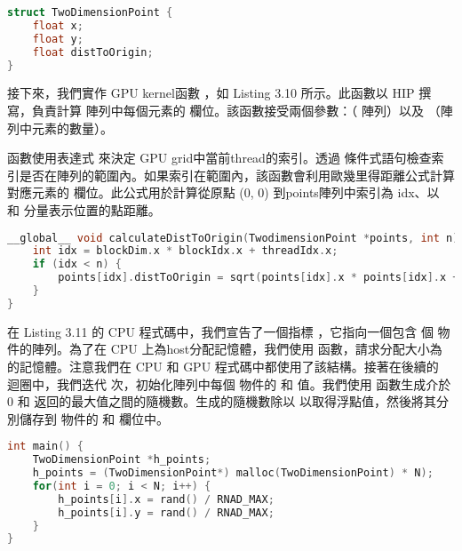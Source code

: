 \begin{lstlisting}[language=C, caption={在HIP中使用struct}, label={9th:example}]
struct TwoDimensionPoint {
    float x;
    float y;
    float distToOrigin;
}
\end{lstlisting}

接下來，我們實作 GPU kernel函數 ，如 Listing 3.10 所示。此函數以 HIP 撰寫，負責計算  陣列中每個元素的  欄位。該函數接受兩個參數：（ 陣列）以及 （陣列中元素的數量）。

函數使用表達式  來決定 GPU grid中當前thread的索引。透過  條件式語句檢查索引是否在陣列的範圍內。如果索引在範圍內，該函數會利用歐幾里得距離公式計算對應元素的  欄位。此公式用於計算從原點 (0, 0) 到points陣列中索引為 idx、以  和  分量表示位置的點距離。

\begin{lstlisting}[language=C, caption={TwoDimensionPoint GPU kernel}, label={10th:example}]
__global__ void calculateDistToOrigin(TwodimensionPoint *points, int n) {
    int idx = blockDim.x * blockIdx.x + threadIdx.x;
    if (idx < n) {
        points[idx].distToOrigin = sqrt(points[idx].x * points[idx].x + points[idx].y * points[idx].y;
    }
}
\end{lstlisting}

在 Listing 3.11 的 CPU 程式碼中，我們宣告了一個指標 ，它指向一個包含  個  物件的陣列。為了在 CPU 上為host分配記憶體，我們使用  函數，請求分配大小為
 的記憶體。注意我們在 CPU 和 GPU 程式碼中都使用了該結構。接著在後續的  迴圈中，我們迭代  次，初始化陣列中每個  物件的  和  值。我們使用  函數生成介於 0 和  返回的最大值之間的隨機數。生成的隨機數除以  以取得浮點值，然後將其分別儲存到  物件的  和  欄位中。

\begin{lstlisting}[language=C, caption={CPU記憶體的配置}, label={11th:example}]
int main() {
    TwoDimensionPoint *h_points;
    h_points = (TwoDimensionPoint*) malloc(TwoDimensionPoint) * N);
    for(int i = 0; i < N; i++) {
        h_points[i].x = rand() / RNAD_MAX;
        h_points[i].y = rand() / RNAD_MAX;
    }
}
\end{lstlisting}

